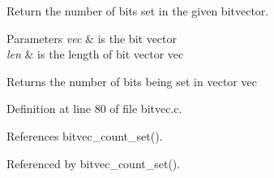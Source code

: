 \-Return the number of bits set in the given bitvector. 


\begin{DoxyParams}{\-Parameters}
{\em vec} & is the bit vector \\
\hline
{\em len} & is the length of bit vector {\ttfamily vec} \\
\hline
\end{DoxyParams}
\begin{DoxyReturn}{\-Returns}
the number of bits being set in vector {\ttfamily vec} 
\end{DoxyReturn}


\-Definition at line 80 of file bitvec.\-c.



\-References bitvec\-\_\-count\-\_\-set().



\-Referenced by bitvec\-\_\-count\-\_\-set().

